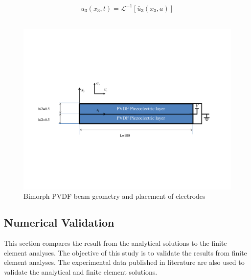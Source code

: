 \begin{equation}
u_3(x_3,t) =\mathcal{L}^{-1} \left[ \bar{u}_3(x_3,a) \right]
\label{eqn:inverse_laplace_of_transverse_displace_ment}
\end{equation}
\\
\begin{figure}
\centering
\includegraphics[trim = 0mm 60mm 10mm 60mm,
clip=true,width=7.0in]{./chap_4_structural_analyses/pdf_beam/bimorph_PVDF_beam_geometry.pdf}
\caption{Bimorph PVDF beam geometry and placement of electrodes}
\label{fig:bimorph_PVDF_beam_geometry}
\end{figure}



\subsection{Numerical Validation}
This section compares the result from the analytical solutions to the finite element analyses.
The objective of this study is to validate the results from finite element analyses.
The experimental data published in literature are also used to validate the analytical and finite element solutions.

